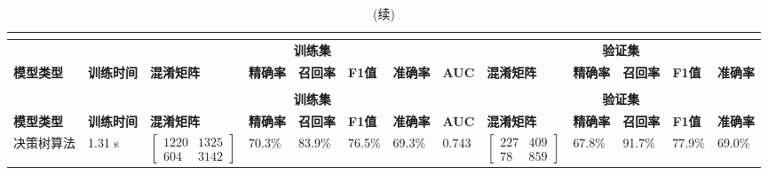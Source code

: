 \begin{landscape}
      \begin{longtable}{m{3cm}<{\centering}m{1.7cm}<{\centering}m{2.3cm}<{\centering}m{1cm}<{\centering}m{1cm}<{\centering}m{1cm}<{\centering}m{1cm}<{\centering}m{1cm}<{\centering}m{2cm}<{\centering}m{1cm}<{\centering}m{1cm}<{\centering}m{1cm}<{\centering}m{1cm}<{\centering}}
            \caption{初筛结果}\\
            \label{tab:model_screen5}\\
            \toprule
            &  & \multicolumn{6}{c}{\textbf{训练集}} & \multicolumn{5}{c}{\textbf{验证集}}                                                                                                                                                                                                      \\
            \multirow{-2}{*}{\textbf{模型类型}} & \multirow{-2}{*}{\textbf{训练时间}} & \textbf{混淆矩阵} &  \textbf{精确率} &  \textbf{召回率} &  \textbf{F1值} &  \textbf{准确率} &  \textbf{AUC} &  \textbf{混淆矩阵} &  \textbf{精确率} &  \textbf{召回率} &  \textbf{F1值} &  \textbf{准确率}    \\
            \midrule
            \endfirsthead
            \caption[]{(续)}\\
            \midrule
            &  & \multicolumn{6}{c}{\textbf{训练集}} & \multicolumn{5}{c}{\textbf{验证集}}                                                                                                                                                                                                      \\
            \multirow{-2}{*}{\textbf{模型类型}} & \multirow{-2}{*}{\textbf{训练时间}} & \textbf{混淆矩阵} &  \textbf{精确率} &  \textbf{召回率} &  \textbf{F1值} &  \textbf{准确率} &  \textbf{AUC} &  \textbf{混淆矩阵} &  \textbf{精确率} &  \textbf{召回率} &  \textbf{F1值} &  \textbf{准确率}    \\
            \midrule
            \endhead 
            \midrule
            \endfoot
            \bottomrule
            \endlastfoot
            决策树算法      &   1.31 s  &     $\left[ \begin{array}{cc} 1220 & 1325 \\ 604 & 3142 \end{array} \right]$ & 70.3\% & 83.9\% &76.5\% & 69.3\% & 0.743 &
            $\left[ \begin{array}{cc} 227 & 409 \\ 78 & 859 \end{array} \right]$ & 67.8\% & 91.7\% & 77.9\% & 69.0\% \\

\end{longtable}
\end{landscape}

